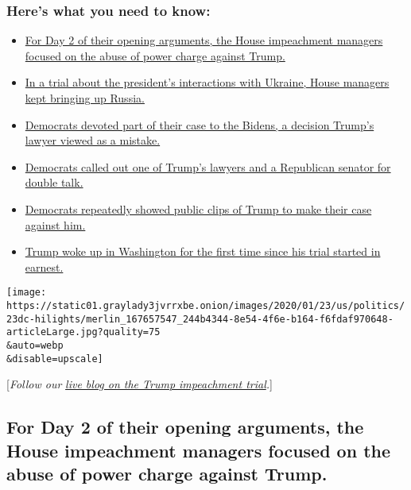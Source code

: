 \hypertarget{heres-what-you-need-to-know}{%
\subsubsection{Here's what you need to
know:}\label{heres-what-you-need-to-know}}

\begin{itemize}
\tightlist
\item
  \protect\hyperlink{link-98bcb56}{For Day 2 of their opening arguments,
  the House impeachment managers focused on the abuse of power charge
  against Trump.}
\item
  \protect\hyperlink{link-3f16ca30}{In a trial about the president's
  interactions with Ukraine, House managers kept bringing up Russia.}
\item
  \protect\hyperlink{link-51343ca5}{Democrats devoted part of their case
  to the Bidens, a decision Trump's lawyer viewed as a mistake.}
\item
  \protect\hyperlink{link-6aa39219}{Democrats called out one of Trump's
  lawyers and a Republican senator for double talk.}
\item
  \protect\hyperlink{link-38e91616}{Democrats repeatedly showed public
  clips of Trump to make their case against him.}
\item
  \protect\hyperlink{link-4b80dde7}{Trump woke up in Washington for the
  first time since his trial started in earnest.}
\end{itemize}

\texttt{[image: https://static01.graylady3jvrrxbe.onion/images/2020/01/23/us/politics/23dc-hilights/merlin\_167657547\_244b4344-8e54-4f6e-b164-f6fdaf970648-articleLarge.jpg?quality=75\\\&auto=webp\\\&disable=upscale]}

{[}\emph{Follow our}
\href{https://www.nytimes3xbfgragh.onion/live/2020/impeachment-trial-live-01-24}{\emph{live
blog on the Trump impeachment trial}}\emph{.}{]}

\hypertarget{for-day-2-of-their-opening-arguments-the-house-impeachment-managers-focused-on-the-abuse-of-power-charge-against-trump}{%
\subsection{For Day 2 of their opening arguments, the House impeachment
managers focused on the abuse of power charge against
Trump.}\label{for-day-2-of-their-opening-arguments-the-house-impeachment-managers-focused-on-the-abuse-of-power-charge-against-trump}}

